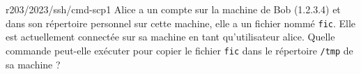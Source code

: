 \begin{question}{r203/2023/ssh/cmd-scp1}
  Alice a un compte sur la machine de Bob (1.2.3.4) et dans son
  répertoire personnel sur cette machine, elle a un fichier nommé
  \texttt{fic}. Elle est actuellement connectée sur sa machine en tant
  qu'utilisateur alice. Quelle commande peut-elle exécuter pour copier
  le fichier \texttt{fic} dans le répertoire \texttt{/tmp} de sa
  machine ?
  \begin{reponses}[3]
    \lastchoices
  \end{reponses}
\end{question}
